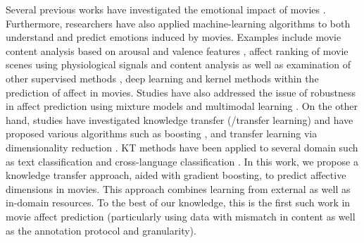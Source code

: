 \documentclass{article}
\begin{document}
\begin{spacing}{0.9}
Several previous works have investigated the emotional impact of movies \cite{bartsch2010predicting, carroll2010movies}. 
Furthermore, researchers have also applied machine-learning algorithms to both understand and predict emotions induced by movies.
Examples include movie content analysis based on arousal and valence features \cite{xu2008hierarchical}, affect ranking of movie scenes using physiological signals and content analysis \cite{soleymani2008affective} as well as examination of other supervised methods \cite{malandrakis2011supervised}, deep learning and kernel methods \cite{baveye2015deep} within the prediction of affect in movies.
Studies have also addressed the issue of robustness in affect prediction using mixture models \cite{goyal2016multimodal} and multimodal learning \cite{pang2015mutlimodal}. 
On the other hand, studies have investigated knowledge transfer (/transfer learning) and have proposed various algorithms such as boosting \cite{dai2007boosting}, and transfer learning via dimensionality reduction \cite{pan2008transfer}.
KT methods have been applied to several domain such as text classification \cite{dai2007transferring} and cross-language classification \cite{ling2008can}.   
In this work, we propose a knowledge transfer approach, aided with gradient boosting, to predict affective dimensions in movies.  
This approach combines learning from external as well as in-domain resources.
To the best of our knowledge, this is the first such work in movie affect prediction (particularly using data with mismatch in content as well as the annotation protocol and granularity). 


\end{spacing}
\end{document}
